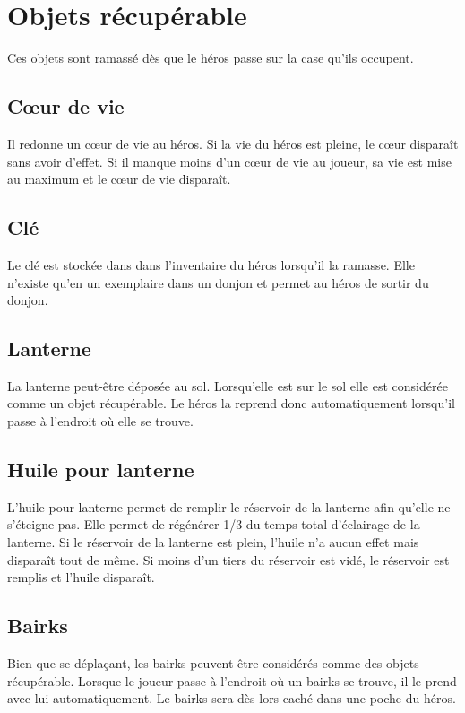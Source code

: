 \documentclass[a4paper, 11pt]{report}
\begin{document}
      \section{Objets récupérable}
        Ces objets sont ramassé dès que le héros passe sur la case qu'ils occupent.
        
        \subsection{Cœur de vie}
          Il redonne un cœur de vie au héros. Si la vie du héros est pleine, le cœur disparaît sans avoir d'effet.
          Si il manque moins d'un cœur de vie au joueur, sa vie est mise au maximum et le cœur de vie
          disparaît.
        
        \subsection{Clé}
          Le clé est stockée dans dans l'inventaire du héros lorsqu'il la ramasse. Elle n'existe qu'en un 
          exemplaire dans un donjon et permet au héros de sortir du donjon.
          
        \subsection{Lanterne}
          La lanterne peut-être déposée au sol. Lorsqu'elle est sur le sol elle est considérée comme un objet
          récupérable. Le héros la reprend donc automatiquement lorsqu'il passe à l'endroit où elle se trouve.
          
        \subsection{Huile pour lanterne}
          L'huile pour lanterne permet de remplir le réservoir de la lanterne afin qu'elle ne s'éteigne pas. Elle
          permet de régénérer 1/3 du temps total d'éclairage de la lanterne. Si le réservoir de la lanterne est 
          plein, l'huile n'a aucun effet mais disparaît tout de même. Si moins d'un tiers du réservoir est vidé, 
          le réservoir est remplis et l'huile disparaît.
          
        \subsection{Bairks}
          Bien que se déplaçant, les bairks peuvent être considérés comme des objets récupérable. Lorsque
          le joueur passe à l'endroit où un bairks se trouve, il le prend avec lui automatiquement. Le bairks
          sera dès lors caché dans une poche du héros.
          
\end{document}
